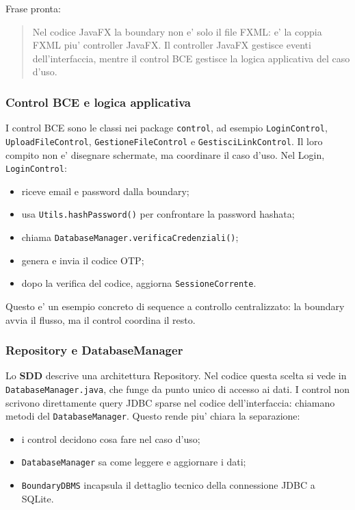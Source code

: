 ﻿\documentclass[11pt,a4paper]{article}
\newcommand{\doc}[1]{\textbf{#1}}
\begin{document}
Frase pronta:
\begin{quote}
Nel codice JavaFX la boundary non e' solo il file FXML: e' la coppia FXML piu' controller
JavaFX. Il controller JavaFX gestisce eventi dell'interfaccia, mentre il control BCE
gestisce la logica applicativa del caso d'uso.
\end{quote}

\subsubsection{Control BCE e logica applicativa}

I control BCE sono le classi nei package \texttt{control}, ad esempio
\texttt{LoginControl}, \texttt{UploadFileControl}, \texttt{GestioneFileControl} e
\texttt{GestisciLinkControl}. Il loro compito non e' disegnare schermate, ma coordinare
il caso d'uso. Nel Login, \texttt{LoginControl}:
\begin{itemize}
  \item riceve email e password dalla boundary;
  \item usa \texttt{Utils.hashPassword()} per confrontare la password hashata;
  \item chiama \texttt{DatabaseManager.verificaCredenziali()};
  \item genera e invia il codice OTP;
  \item dopo la verifica del codice, aggiorna \texttt{SessioneCorrente}.
\end{itemize}

Questo e' un esempio concreto di sequence a controllo centralizzato: la boundary avvia il
flusso, ma il control coordina il resto.

\subsubsection{Repository e DatabaseManager}

Lo \doc{SDD} descrive una architettura Repository. Nel codice questa scelta si vede in
\texttt{DatabaseManager.java}, che funge da punto unico di accesso ai dati. I control non
scrivono direttamente query JDBC sparse nel codice dell'interfaccia: chiamano metodi del
\texttt{DatabaseManager}. Questo rende piu' chiara la separazione:
\begin{itemize}
  \item i control decidono cosa fare nel caso d'uso;
  \item \texttt{DatabaseManager} sa come leggere e aggiornare i dati;
  \item \texttt{BoundaryDBMS} incapsula il dettaglio tecnico della connessione JDBC a
  SQLite.
\end{itemize}
\end{document}
